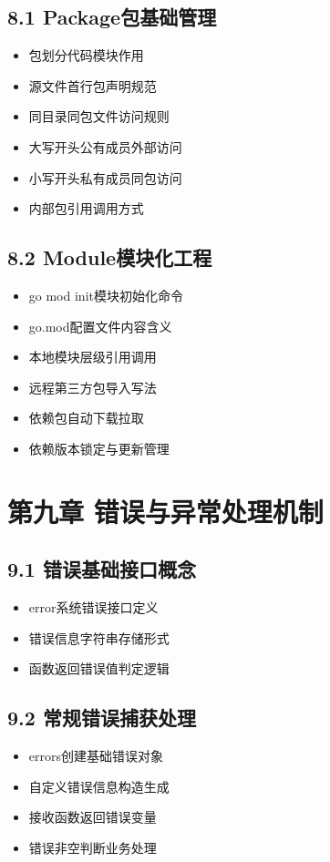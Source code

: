 \subsection{8.1 Package包基础管理}
\begin{itemize}
\item 包划分代码模块作用
\item 源文件首行包声明规范
\item 同目录同包文件访问规则
\item 大写开头公有成员外部访问
\item 小写开头私有成员同包访问
\item 内部包引用调用方式
\end{itemize}

\subsection{8.2 Module模块化工程}
\begin{itemize}
\item go mod init模块初始化命令
\item go.mod配置文件内容含义
\item 本地模块层级引用调用
\item 远程第三方包导入写法
\item 依赖包自动下载拉取
\item 依赖版本锁定与更新管理
\end{itemize}

\section{第九章 错误与异常处理机制}
\subsection{9.1 错误基础接口概念}
\begin{itemize}
\item error系统错误接口定义
\item 错误信息字符串存储形式
\item 函数返回错误值判定逻辑
\end{itemize}

\subsection{9.2 常规错误捕获处理}
\begin{itemize}
\item errors创建基础错误对象
\item 自定义错误信息构造生成
\item 接收函数返回错误变量
\item 错误非空判断业务处理
\end{itemize}

